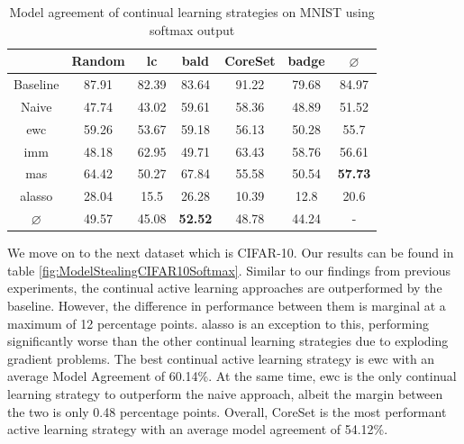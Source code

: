 \begin{table}[h]
    \centering
    \begin{tabular}{ c | c c c c c | c } 
         & Random & \gls{lc} & \gls{bald} & CoreSet & \gls{badge} & $\varnothing$\\ 
        \hline
        Baseline & 87.91 & 82.39 & 83.64 & 91.22 & 79.68 & 84.97\\
        \hline
        Naive & 47.74 & 43.02 & 59.61 & 58.36 & 48.89 & 51.52\\
        \gls{ewc} &  59.26 & 53.67 & 59.18 & 56.13 & 50.28 & 55.7\\
        \gls{imm} & 48.18 & 62.95 & 49.71 & 63.43 & 58.76 & 56.61 \\
        \gls{mas} &  64.42 & 50.27 & 67.84 & 55.58 & 50.54 & \textbf{57.73}\\
        \gls{alasso} & 28.04 & 15.5 & 26.28 & 10.39 & 12.8 & 20.6\\
        \hline
        $\varnothing$ & 49.57 & 45.08 & \textbf{52.52} & 48.78 & 44.24 & -\\
    \end{tabular}
    \caption{Model agreement of continual learning strategies on MNIST using softmax output}
    \label{fig:ModelStealingMNISTSoftmax}
\end{table}


We move on to the next dataset which is CIFAR-10. Our results can be found in  table \ref{fig:ModelStealingCIFAR10Softmax}. Similar to our findings from previous experiments,
the continual active learning approaches are outperformed by the baseline. However, the difference in performance between them is marginal at a maximum of 12 percentage points.
\gls{alasso} is an exception to this, performing significantly worse than the other continual learning strategies due to exploding gradient problems. The best continual active
learning strategy is \gls{ewc} with an average Model Agreement of 60.14\%. At the same time, \gls{ewc} is the only continual learning strategy to outperform the naive approach,
albeit the margin between the two is only 0.48 percentage points. Overall, CoreSet is the most performant active learning strategy with an average model agreement of 54.12\%. \par

